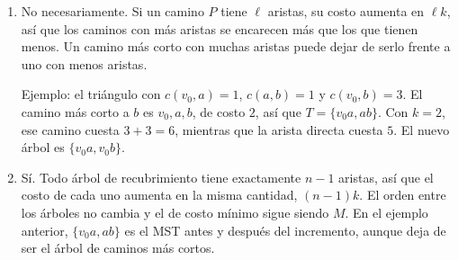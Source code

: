 \ejercicio{}

\begin{enumerate}[label=(\alph*)]
  \item No necesariamente. Si un camino $P$ tiene $\ell$ aristas, su costo aumenta en $\ell k$, así que los caminos con más aristas se encarecen más que los que tienen menos. Un camino más corto con muchas aristas puede dejar de serlo frente a uno con menos aristas.

  Ejemplo: el triángulo con $c(v_0, a) = 1$, $c(a, b) = 1$ y $c(v_0, b) = 3$. El camino más corto a $b$ es $v_0, a, b$, de costo $2$, así que $T = \{v_0a, ab\}$. Con $k = 2$, ese camino cuesta $3 + 3 = 6$, mientras que la arista directa cuesta $5$. El nuevo árbol es $\{v_0a, v_0b\}$.

  \item Sí. Todo árbol de recubrimiento tiene exactamente $n - 1$ aristas, así que el costo de cada uno aumenta en la misma cantidad, $(n - 1)k$. El orden entre los árboles no cambia y el de costo mínimo sigue siendo $M$. En el ejemplo anterior, $\{v_0a, ab\}$ es el MST antes y después del incremento, aunque deja de ser el árbol de caminos más cortos.
\end{enumerate}
